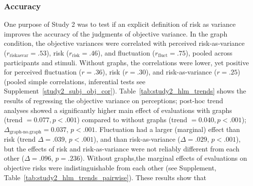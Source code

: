 \documentclass[a4paper,man, natbib,floatsintext]{apa6} %
\begin{document}
\subsubsection{Accuracy}
One purpose of Study 2 was to test if an explicit definition of risk as variance improves the accuracy of the judgments of objective variance. In the graph condition, the objective variances were correlated with perceived risk-as-variance ($r_{\text{riskasvar}} = .53$), risk ($r_{\text{risk}} =.46$), and fluctuation ($r_{\text{fluct}} = .75$), pooled across participants and stimuli. Without graphs, the correlations were lower, yet positive for perceived fluctuation ($r=.36$), risk ($r=.30$), and risk-as-variance ($r=.25$) (pooled simple correlations, inferential tests see Supplement~\ref{study2_subj_obj_cor}). Table~\ref{tab:study2_hlm_trends} shows the results of regressing the objective variance on perceptions; post-hoc trend analyses showed a significantly higher main effect of evaluations with graphs (trend $=0.077, p < .001$) compared to without graphs (trend $=0.040, p < .001$); $\Delta_{\text{graph-no.graph}}=0.037$, $p<.001$. Fluctuation had a larger  (marginal) effect than risk (trend $\Delta=.039$, $p<.001$), and than risk-as-variance ($\Delta=.029$, $p < .001$), but the effects of risk and risk-as-variance were not reliably different from each other ($\Delta=.096$, $p=.236$). Without graphs,the marginal effects of evaluations on objective risks were indistinguishable from each other (see Supplement, Table~\ref{tab:study2_hlm_trends_pairwise}). These results show that 
\end{document}
